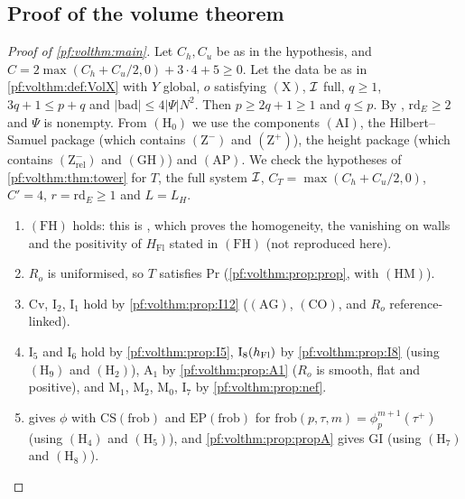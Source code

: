 \subsection{Proof of the volume theorem}\label{pf:volthm:sec:proof}

\begin{proof}[Proof of \cref{pf:volthm:main}]
Let $C_h,C_u$ be as in the hypothesis, and $C=2\max(C_h+C_u/2,0)+3\cdot4+5\ge0$. Let the data be as in
\cref{pf:volthm:def:VolX} with $Y$ global, $o$ satisfying $(\mathrm{X})$, $\mathcal{I}$ full, $q\ge1$, $3q+1\le p+q$ and
$|\mathrm{bad}|\le4|\Psi|N^2$. Then $p\ge2q+1\ge1$ and $q\le p$. By
, $\mathrm{rd}_E\ge2$ and $\Psi$ is nonempty.
From $(\mathrm{H}_0)$ we use the components $(\mathrm{AI})$, the Hilbert--Samuel package (which contains
$(\mathrm{Z}^-)$ and $(\mathrm{Z}^+)$),
the height package (which contains $(\mathrm{Z}^-_{\mathrm{rel}})$ and
$(\mathrm{GH})$) and $(\mathrm{AP})$. We check the hypotheses of
\cref{pf:volthm:thm:tower} for $T$, the full system $\mathcal{I}$, $C_T=\max(C_h+C_u/2,0)$, $C'=4$,
$r=\mathrm{rd}_E\ge1$ and $L=L_H$.
\begin{enumerate}[label=(\arabic*)]
\item $(\mathrm{FH})$ holds: this is , which proves the homogeneity, the
  vanishing on walls and the positivity of $H_{\mathrm{Fl}}$ stated in $(\mathrm{FH})$ (not reproduced here).
\item $R_o$ is uniformised, so $T$ satisfies $\mathrm{Pr}$ (\cref{pf:volthm:prop:prop}, with
  $(\mathrm{HM})$).
\item $\mathrm{Cv}$, $\mathrm{I}_2$, $\mathrm{I}_1$ hold by \cref{pf:volthm:prop:I12} ($(\mathrm{AG})$,
  $(\mathrm{CO})$, and $R_o$ reference-linked).
\item $\mathrm{I}_5$ and $\mathrm{I}_6$ hold by \cref{pf:volthm:prop:I5}, $\mathrm{I}_8(h_{\mathrm{Fl}})$ by \cref{pf:volthm:prop:I8}
  (using $(\mathrm{H}_9)$ and $(\mathrm{H}_2)$), $\mathrm{A}_1$ by \cref{pf:volthm:prop:A1} ($R_o$ is smooth, flat and
  positive), and $\mathrm{M}_1$, $\mathrm{M}_2$, $\mathrm{M}_0$, $\mathrm{I}_7$ by \cref{pf:volthm:prop:nef}.
\item {} gives $\phi$ with $\mathrm{CS}(\mathrm{frob})$ and $\mathrm{EP}(\mathrm{frob})$ for
  $\mathrm{frob}(p,\tau,m)=\phi_p^{m+1}(\tau^+)$ (using $(\mathrm{H}_4)$ and $(\mathrm{H}_5)$), and
  \cref{pf:volthm:prop:propA} gives $\mathrm{GI}$ (using $(\mathrm{H}_7)$ and $(\mathrm{H}_8)$).

\end{enumerate}
\end{proof}
